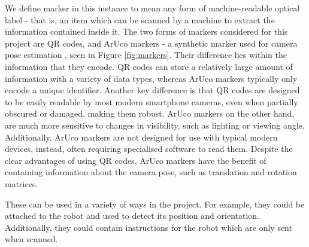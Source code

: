 \documentclass{l4proj}
\begin{document}
We define marker in this instance to mean any form of machine-readable optical label - that is, an item which can be scanned by a machine to extract the information contained inside it. The two forms of markers considered for this project are QR codes, and ArUco markers - a synthetic marker used for camera pose estimation \citep{aruco}, seen in Figure \ref{fig:markers}. Their difference lies within the information that they encode. QR codes can store a relatively large amount of information with a variety of data types, whereas ArUco markers typically only encode a unique identifier. Another key difference is that QR codes are designed to be easily readable by most modern smartphone cameras, even when partially obscured or damaged, making them robust. ArUco markers on the other hand, are much more sensitive to changes in visibility, such as lighting or viewing angle. Additionally, ArUco markers are not designed for use with typical modern devices, instead, often requiring specialised software to read them. Despite the clear advantages of using QR codes, ArUco markers have the benefit of containing information about the camera pose, such as translation and rotation matrices.

These can be used in a variety of ways in the project. For example, they could be attached to the robot and used to detect its position and orientation. Additionally, they could contain instructions for the robot which are only sent when scanned.
\end{document}
